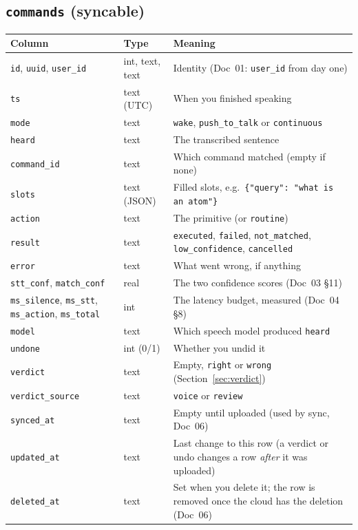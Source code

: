 \documentclass[11pt,a4paper]{article}
\begin{document}
\subsection{\texttt{commands} (syncable)}
\begin{center}
\renewcommand{\arraystretch}{1.1}
\begin{tabularx}{\textwidth}{l l X}
\toprule
\textbf{Column} & \textbf{Type} & \textbf{Meaning} \\
\midrule
\texttt{id}, \texttt{uuid}, \texttt{user\_id} & int, text, text & Identity (Doc~01: \texttt{user\_id} from day one) \\
\texttt{ts}              & text (UTC) & When you finished speaking \\
\texttt{mode}            & text & \texttt{wake}, \texttt{push\_to\_talk} or \texttt{continuous} \\
\texttt{heard}           & text & The transcribed sentence \\
\texttt{command\_id}     & text & Which command matched (empty if none) \\
\texttt{slots}           & text (JSON) & Filled slots, e.g.\ \texttt{\{"query": "what is an atom"\}} \\
\texttt{action}          & text & The primitive (or \texttt{routine}) \\
\texttt{result}          & text & \texttt{executed}, \texttt{failed}, \texttt{not\_matched}, \texttt{low\_confidence}, \texttt{cancelled} \\
\texttt{error}           & text & What went wrong, if anything \\
\texttt{stt\_conf}, \texttt{match\_conf} & real & The two confidence scores (Doc~03 \S11) \\
\texttt{ms\_silence}, \texttt{ms\_stt}, \texttt{ms\_action}, \texttt{ms\_total} & int & The latency budget, measured (Doc~04 \S8) \\
\texttt{model}           & text & Which speech model produced \texttt{heard} \\
\texttt{undone}          & int (0/1) & Whether you undid it \\
\texttt{verdict}         & text & Empty, \texttt{right} or \texttt{wrong} (Section~\ref{sec:verdict}) \\
\texttt{verdict\_source} & text & \texttt{voice} or \texttt{review} \\
\texttt{synced\_at}      & text & Empty until uploaded (used by sync, Doc~06) \\
\texttt{updated\_at}     & text & Last change to this row (a verdict or undo changes a row \emph{after} it was uploaded) \\
\texttt{deleted\_at}     & text & Set when you delete it; the row is removed once the cloud has the deletion (Doc~06) \\
\bottomrule
\end{tabularx}
\end{center}
\end{document}
